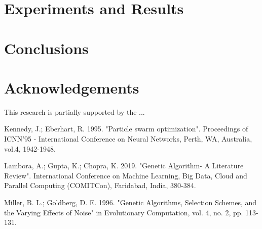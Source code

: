\documentclass[runningheads]{llncs}
\begin{document}
\section{Experiments and Results}

\section{Conclusions}

\section*{Acknowledgements} This research is partially supported by the ...

\begin{thebibliography}{8}

 Kennedy, J.; Eberhart, R. 1995. "Particle swarm optimization". Proceedings of ICNN'95 - International Conference on Neural Networks, Perth, WA, Australia, vol.4, 1942-1948.

 Lambora, A.; Gupta, K.; Chopra, K. 2019. "Genetic Algorithm- A Literature Review". International Conference on Machine Learning, Big Data, Cloud and Parallel Computing (COMITCon), Faridabad, India, 380-384.

 Miller, B. L.; Goldberg, D. E. 1996. "Genetic Algorithms, Selection Schemes, and the Varying Effects of Noise" in Evolutionary Computation, vol. 4, no. 2, pp. 113-131.

\end{thebibliography}
\end{document}
